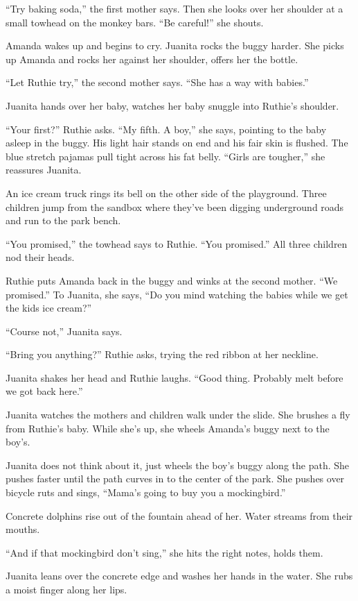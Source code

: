 \documentclass[twoside,10pt]{book}
\begin{document}
``Try baking soda,'' the first mother says. Then she looks over her
shoulder at a small towhead on the monkey bars. ``Be careful!'' she
shouts.

Amanda wakes up and begins to cry. Juanita rocks the buggy harder. She
picks up Amanda and rocks her against her shoulder, offers her the
bottle.

``Let Ruthie try,'' the second mother says. ``She has a way with
babies.''

Juanita hands over her baby, watches her baby snuggle into Ruthie's
shoulder.

``Your first?'' Ruthie asks. ``My fifth. A boy,'' she says, pointing to
the baby asleep in the buggy. His light hair stands on end and his fair
skin is flushed. The blue stretch pajamas pull tight across his fat
belly. ``Girls are tougher,'' she reassures Juanita.

An ice cream truck rings its bell on the other side of the playground.
Three children jump from the sandbox where they've been digging
underground roads and run to the park bench.

``You promised,'' the towhead says to Ruthie. ``You promised.'' All
three children nod their heads.

Ruthie puts Amanda back in the buggy and winks at the second mother.
``We promised.'' To Juanita, she says, ``Do you mind watching the babies
while we get the kids ice cream?''

``Course not,'' Juanita says.

``Bring you anything?'' Ruthie asks, trying the red ribbon at her
neckline.

Juanita shakes her head and Ruthie laughs. ``Good thing. Probably melt
before we got back here.''

Juanita watches the mothers and children walk under the slide. She
brushes a fly from Ruthie's baby. While she's up, she wheels Amanda's
buggy next to the boy's.

Juanita does not think about it, just wheels the boy's buggy along the
path. She pushes faster until the path curves in to the center of the
park. She pushes over bicycle ruts and sings, ``Mama's going to buy you
a mockingbird.''

Concrete dolphins rise out of the fountain ahead of her. Water streams
from their mouths.

``And if that mockingbird don't sing,'' she hits the right notes, holds
them.

Juanita leans over the concrete edge and washes her hands in the water.
She rubs a moist finger along her lips.
\end{document}

